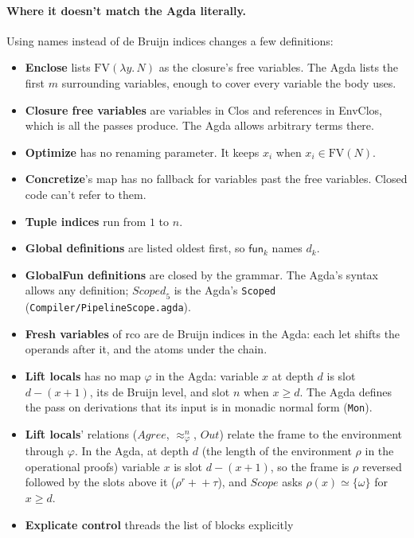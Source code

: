 \documentclass[10pt]{article}
\theoremstyle{acmplain}
\newcommand{\key}[1]{\mathsf{#1}}
\newcommand{\lam}[1]{\lambda #1.\,}
\newcommand{\funref}[1]{\key{fun}_{#1}}
\newcommand{\FV}{\mathrm{FV}}
\begin{document}
\paragraph{Where it doesn't match the Agda literally.}
Using names instead of de Bruijn indices changes a few definitions:
\begin{itemize}
\item \textbf{Enclose} lists $\FV(\lam{y} N)$ as the closure's free variables.
  The Agda lists the first $m$ surrounding variables, enough to cover every
  variable the body uses.
\item \textbf{Closure free variables} are variables in Clos and
  references in EnvClos, which is all the passes produce. The Agda allows
  arbitrary terms there.
\item \textbf{Optimize} has no renaming parameter. It keeps $x_i$ when
  $x_i \in \FV(N)$.
\item \textbf{Concretize}'s map has no fallback for variables past the free
  variables. Closed code can't refer to them.
\item \textbf{Tuple indices} run from $1$ to $n$.
\item \textbf{Global definitions} are listed oldest first, so $\funref{k}$ names $d_k$.
\item \textbf{GlobalFun definitions} are closed by the grammar. The Agda's
  syntax allows any definition; $\mathit{Scoped}_5$ is the Agda's
  \texttt{Scoped} (\texttt{Compiler/PipelineScope.agda}).
\item \textbf{Fresh variables} of rco are de Bruijn indices in the Agda:
  each let shifts the operands after it, and the atoms under the chain.
\item \textbf{Lift locals} has no map $\varphi$ in the Agda: variable $x$
  at depth $d$ is slot $d - (x + 1)$, its de Bruijn level, and slot $n$ when
  $x \geq d$. The Agda defines the pass on derivations that its input is
  in monadic normal form (\texttt{Mon}).
\item \textbf{Lift locals}' relations ($\mathit{Agree}$, $\approx^n_\varphi$,
  $\mathit{Out}$) relate the frame to the environment through $\varphi$.
  In the Agda, at depth $d$ (the length of the environment $\rho$ in the
  operational proofs) variable $x$ is slot $d - (x + 1)$, so the frame
  is $\rho$ reversed followed by the slots above it ($\rho \mathbin{{}^{r}{+}\!\!{+}} \tau$),
  and $\mathit{Scope}$ asks $\rho(x) \simeq \{\omega\}$ for $x \geq d$.
\item \textbf{Explicate control} threads the list of blocks explicitly

\end{itemize}
\end{document}
